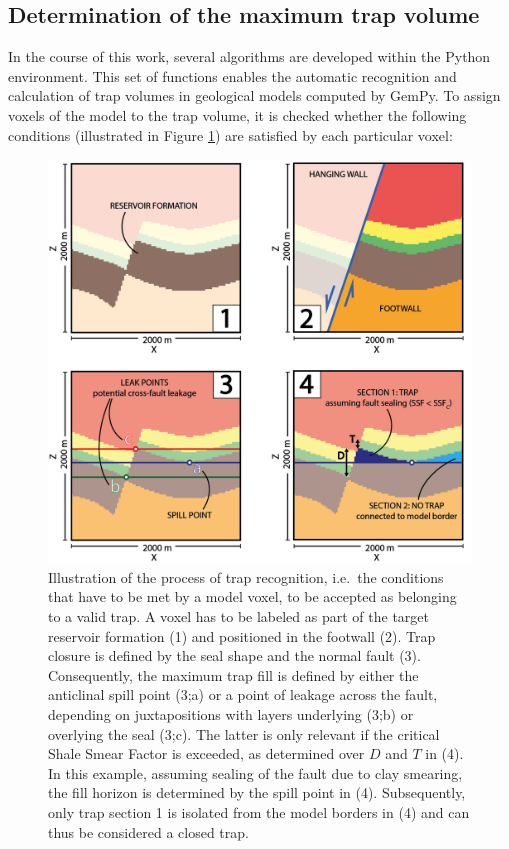 		\subsection{Determination of the maximum trap volume}
		In the course of this work, several algorithms are developed within the Python environment. This set of functions enables the automatic recognition and calculation of trap volumes in geological models computed by GemPy. To assign voxels of the model to the trap volume, it is checked whether the following conditions (illustrated in Figure \ref{fig:trap_recognition}) are satisfied by each particular voxel: 
		\begin{figure}[p!]
			\centering
			\includegraphics[width=1\textwidth]{Figures/Trap_Cond_H.png}
			\caption{Illustration of the process of trap recognition, i.e.\ the conditions that have to be met by a model voxel, to be accepted as belonging to a valid trap. A voxel has to be labeled as part of the target reservoir formation (1) and positioned in the footwall (2). Trap closure is defined by the seal shape and the normal fault (3). Consequently, the maximum trap fill is defined by either the anticlinal spill point (3;a) or a point of leakage across the fault, depending on juxtapositions with layers underlying (3;b) or overlying the seal (3;c). The latter is only relevant if the critical Shale Smear Factor is exceeded, as determined over $D$ and $T$ in (4). In this example, assuming sealing of the fault due to clay smearing, the fill horizon is determined by the spill point in (4). Subsequently, only trap section 1 is isolated from the model borders in (4) and can thus be considered a closed trap.}\label{fig:trap_recognition}
		\end{figure}
